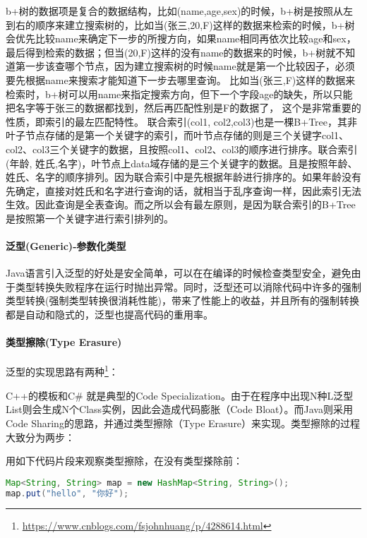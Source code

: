 \documentclass[../../../interview-questions.tex]{subfiles}
\begin{document}
b+树的数据项是复合的数据结构，比如(name,age,sex)的时候，b+树是按照从左到右的顺序来建立搜索树的，比如当(张三,20,F)这样的数据来检索的时候，b+树会优先比较name来确定下一步的所搜方向，如果name相同再依次比较age和sex，最后得到检索的数据；但当(20,F)这样的没有name的数据来的时候，b+树就不知道第一步该查哪个节点，因为建立搜索树的时候name就是第一个比较因子，必须要先根据name来搜索才能知道下一步去哪里查询。
比如当(张三,F)这样的数据来检索时，b+树可以用name来指定搜索方向，但下一个字段age的缺失，所以只能把名字等于张三的数据都找到，然后再匹配性别是F的数据了， 这个是非常重要的性质，即索引的最左匹配特性。
联合索引(col1, col2,col3)也是一棵B+Tree，其非叶子节点存储的是第一个关键字的索引，而叶节点存储的则是三个关键字col1、col2、col3三个关键字的数据，且按照col1、col2、col3的顺序进行排序。联合索引(年龄, 姓氏,名字)，叶节点上data域存储的是三个关键字的数据。且是按照年龄、姓氏、名字的顺序排列。因为联合索引中是先根据年龄进行排序的。如果年龄没有先确定，直接对姓氏和名字进行查询的话，就相当于乱序查询一样，因此索引无法生效。因此查询是全表查询。而之所以会有最左原则，是因为联合索引的B+Tree是按照第一个关键字进行索引排列的。


\paragraph{泛型(Generic)-参数化类型}

Java语言引入泛型的好处是安全简单，可以在在编译的时候检查类型安全，避免由于类型转换失败程序在运行时抛出异常。同时，泛型还可以消除代码中许多的强制类型转换(强制类型转换很消耗性能)，带来了性能上的收益，并且所有的强制转换都是自动和隐式的，泛型也提高代码的重用率。

\paragraph{类型擦除(Type Erasure)}

泛型的实现思路有两种\footnote{\url{https://www.cnblogs.com/fsjohnhuang/p/4288614.html}}：



C++的模板和C\# 就是典型的Code Specialization。由于在程序中出现N种L泛型List则会生成N个Class实例，因此会造成代码膨胀（Code Bloat）。而Java则采用Code Sharing的思路，并通过类型擦除（Type Erasure）来实现。类型擦除的过程大致分为两步：


用如下代码片段来观察类型擦除，在没有类型搽除前：

\begin{lstlisting}[language=Java]
Map<String, String> map = new HashMap<String, String>();
map.put("hello", "你好");
\end{lstlisting}
\end{document}
